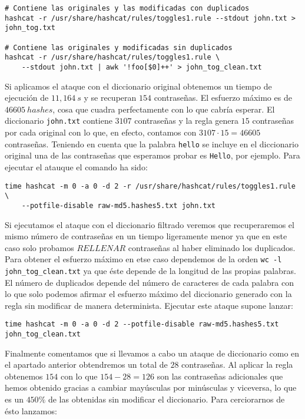 \documentclass{article}
\begin{document}
            \begin{verbatim}
# Contiene las originales y las modificadas con duplicados
hashcat -r /usr/share/hashcat/rules/toggles1.rule --stdout john.txt > john_tog.txt

# Contiene las originales y modificadas sin duplicados
hashcat -r /usr/share/hashcat/rules/toggles1.rule \
    --stdout john.txt | awk '!foo[$0]++' > john_tog_clean.txt
            \end{verbatim}

            Si aplicamos el ataque con el diccionario original obtenemos un tiempo de ejecución de $11,164\ s$ y se recuperan $154$ contraseñas. El esfuerzo máximo es de $46605\ hashes$, cosa que cuadra perfectamente con lo que cabría esperar. El diccionario \texttt{john.txt} contiene $3107$ contraseñas y la regla genera $15$ contraseñas por cada original con lo que, en efecto, contamos con $3107 \cdot 15 = 46605$ contraseñas. Teniendo en cuenta que la palabra \texttt{hello} se incluye en el diccionario original una de las contraseñas que esperamos probar es \texttt{Hello}, por ejemplo. Para ejecutar el atauque el comando ha sido:


            \begin{verbatim}
time hashcat -m 0 -a 0 -d 2 -r /usr/share/hashcat/rules/toggles1.rule \
    --potfile-disable raw-md5.hashes5.txt john.txt
            \end{verbatim}

            Si ejecutamos el ataque con el diccionario filtrado veremos que recuperaremos el mismo número de contraseñas en un tiempo ligeramente menor ya que en este caso solo probamos $RELLENAR$ contraseñas al haber eliminado los duplicados. Para obtener el esfuerzo máximo en etse caso dependemos de la orden \texttt{wc -l john\_tog\_clean.txt} ya que éste depende de la longitud de las propias palabras. El número de duplicados depende del número de caracteres de cada palabra con lo que solo podemos afirmar el esfuerzo máximo del diccionario generado con la regla sin modificar de manera determinista. Ejecutar este ataque supone lanzar:

            \begin{verbatim}
time hashcat -m 0 -a 0 -d 2 --potfile-disable raw-md5.hashes5.txt john_tog_clean.txt
            \end{verbatim}

            Finalmente comentamos que si llevamos a cabo un ataque de diccionario como en el apartado anterior obtendremos un total de $28$ contraseñas. Al aplicar la regla obtenemos $154$ con lo que $154 - 28 = 126$ son las contraseñas adicionales que hemos obtenido gracias a cambiar mayúsculas por minúsculas y viceversa, lo que es un $450\%$ de las obtenidas sin modificar el diccionario. Para cerciorarnos de ésto lanzamos:
            
\end{document}
